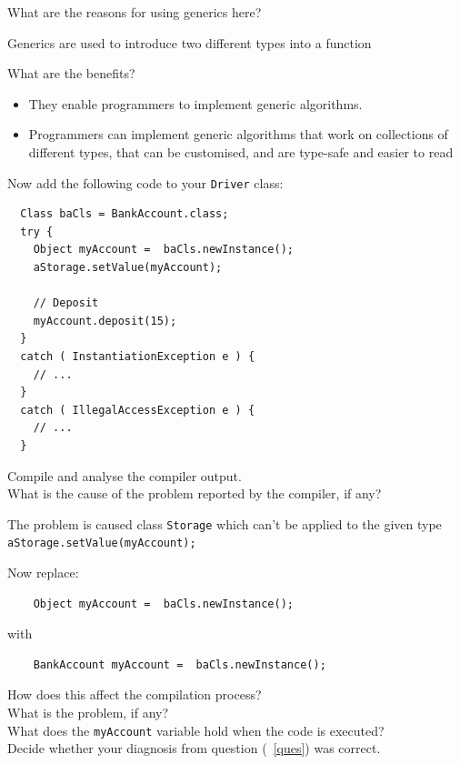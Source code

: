 \documentclass[11pt,a4paper]{exam}
\begin{document}
\begin{questions}

\question What are the reasons for using generics here? 

\begin{solution}
Generics are used to introduce two different types into a function	
\end{solution}

\item What are the benefits? 

\begin{solution}
\begin{itemize}
\item They enable programmers to implement generic algorithms. 
\item Programmers can implement generic algorithms that work on collections of different types, that can be customised, and are type-safe and easier to read
\end{itemize}
\end{solution}

\item\label{ques}
Now add the following code to your \texttt{Driver} class:
\begin{Verbatim}
  Class baCls = BankAccount.class;
  try {
    Object myAccount =  baCls.newInstance();
    aStorage.setValue(myAccount);
    
    // Deposit
    myAccount.deposit(15);
  }
  catch ( InstantiationException e ) {
    // ...
  }
  catch ( IllegalAccessException e ) {
    // ...
  }
\end{Verbatim}

\noindent Compile and analyse the compiler output. \\
What is the cause of the problem reported by the compiler, if any?

\begin{solution}
The problem is caused class \verb!Storage! which can't be applied to the
given type \verb!aStorage.setValue(myAccount);!
\end{solution}

\item
Now replace:
\begin{Verbatim}
    Object myAccount =  baCls.newInstance();
\end{Verbatim}
with
\begin{Verbatim}
    BankAccount myAccount =  baCls.newInstance();
\end{Verbatim}

\noindent How does this affect the compilation process? \\
What is the problem, if any? \\
What does the \texttt{myAccount} variable hold when the code is executed?\\
Decide whether your diagnosis from question (~\ref{ques}) was correct.


\end{questions}
\end{document}
